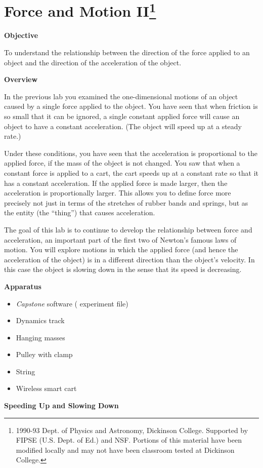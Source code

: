 
\section{Force and Motion II\footnote{
1990-93 Dept. of Physics and Astronomy, Dickinson College. Supported by FIPSE
(U.S. Dept. of Ed.) and NSF. Portions of this material have been modified locally
and may not have been classroom tested at Dickinson College.
}}

\makelabheader %

\textbf{Objective} 

To understand the relationship between the direction of the force applied to
an object and the direction of the acceleration of the object. 

\textbf{Overview} 

In the previous lab you examined the one-dimensional motions of an object caused
by a single force applied to the object. You have seen that when friction is
so small that it can be ignored, a single constant applied force will cause
an object to have a constant acceleration. (The object will speed up at a steady
rate.) 

Under these conditions, you have seen that the acceleration is proportional
to the applied force, if the mass of the object is not changed. You saw that
when a constant force is applied to a cart, the cart speeds up at a constant
rate so that it has a constant acceleration. If the applied force is made larger,
then the acceleration is proportionally larger. This allows you to define force
more precisely not just in terms of the stretches of rubber bands and springs,
but as the entity (the ``thing'') that causes acceleration.

The goal of this lab is to continue to develop the relationship between force
and acceleration, an important part of the first two of Newton's famous laws
of motion. You will explore motions in which the applied force (and hence the
acceleration of the object) is in a different direction than the object's velocity.
In this case the object is slowing down in the sense that its speed is decreasing.

\textbf{Apparatus}

\begin{itemize}
\item \textit{Capstone} software ( experiment file)
\item Dynamics track
\item Hanging masses
\item Pulley with clamp
\item String
\item Wireless smart cart
\end{itemize}
\textbf{Speeding Up and Slowing Down }

